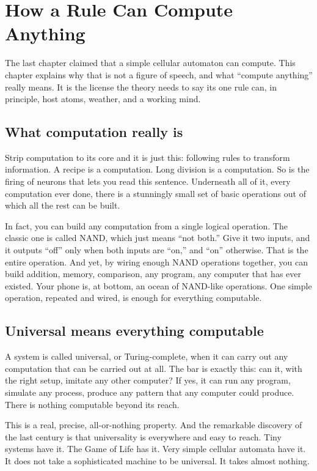 \section{How a Rule Can Compute Anything}

The last chapter claimed that a simple cellular automaton can compute. This chapter explains why that is not a figure of speech, and what ``compute anything'' really means. It is the license the theory needs to say its one rule can, in principle, host atoms, weather, and a working mind.

\subsection{What computation really is}

Strip computation to its core and it is just this: following rules to transform information. A recipe is a computation. Long division is a computation. So is the firing of neurons that lets you read this sentence. Underneath all of it, every computation ever done, there is a stunningly small set of basic operations out of which all the rest can be built.

In fact, you can build any computation from a single logical operation. The classic one is called NAND, which just means ``not both.'' Give it two inputs, and it outputs ``off'' only when both inputs are ``on,'' and ``on'' otherwise. That is the entire operation. And yet, by wiring enough NAND operations together, you can build addition, memory, comparison, any program, any computer that has ever existed. Your phone is, at bottom, an ocean of NAND-like operations. One simple operation, repeated and wired, is enough for everything computable.

\subsection{Universal means everything computable}

A system is called universal, or Turing-complete, when it can carry out any computation that can be carried out at all. The bar is exactly this: can it, with the right setup, imitate any other computer? If yes, it can run any program, simulate any process, produce any pattern that any computer could produce. There is nothing computable beyond its reach.

This is a real, precise, all-or-nothing property. And the remarkable discovery of the last century is that universality is everywhere and easy to reach. Tiny systems have it. The Game of Life has it. Very simple cellular automata have it. It does not take a sophisticated machine to be universal. It takes almost nothing.

